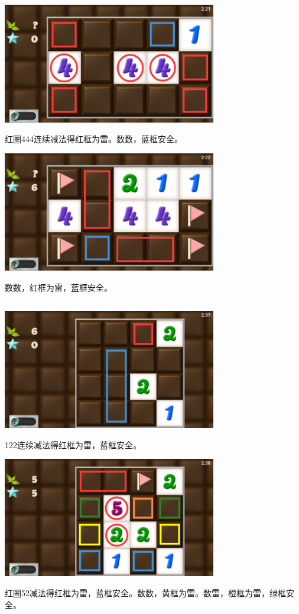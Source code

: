 \subsection{} %
\begin{center}
    \includegraphics[width=0.7\textwidth]{puzzle/30-1.png}
\end{center}
红圈444连续减法得红框为雷。数数，蓝框安全。
\begin{center}
    \includegraphics[width=0.7\textwidth]{puzzle/30-2.png}
\end{center}
数数，红框为雷，蓝框安全。

\subsection{} %
\begin{center}
    \includegraphics[width=0.7\textwidth]{puzzle/31-1.png}
\end{center}
122连续减法得红框为雷，蓝框安全。
\begin{center}
    \includegraphics[width=0.7\textwidth]{puzzle/31-2.png}
\end{center}
红圈52减法得红框为雷，蓝框安全。数数，黄框为雷。数雷，橙框为雷，绿框安全。

